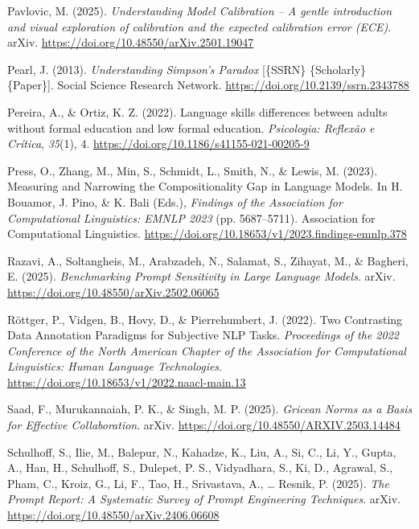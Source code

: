 \documentclass[
  12pt,
]{article}
\newlength{\cslhangindent}
\newenvironment{CSLReferences}[2] %
 {\begin{list}{}{%
  \setlength{\itemindent}{0pt}
  \setlength{\leftmargin}{0pt}
  \setlength{\parsep}{0pt}
  \ifodd #1
   \setlength{\leftmargin}{\cslhangindent}
   \setlength{\itemindent}{-1\cslhangindent}
  \fi
  \setlength{\itemsep}{#2\baselineskip}}}
 {\end{list}}
\begin{document}
\begin{CSLReferences}{1}{0}
Pavlovic, M. (2025). \emph{Understanding {Model} {Calibration} -- {A} gentle introduction and visual exploration of calibration and the expected calibration error ({ECE})}. arXiv. \url{https://doi.org/10.48550/arXiv.2501.19047}

Pearl, J. (2013). \emph{Understanding {Simpson}'s {Paradox}} {[}\{SSRN\} \{Scholarly\} \{Paper\}{]}. Social Science Research Network. \url{https://doi.org/10.2139/ssrn.2343788}

Pereira, A., \& Ortiz, K. Z. (2022). Language skills differences between adults without formal education and low formal education. \emph{Psicologia: Reflexão e Crítica}, \emph{35}(1), 4. \url{https://doi.org/10.1186/s41155-021-00205-9}

Press, O., Zhang, M., Min, S., Schmidt, L., Smith, N., \& Lewis, M. (2023). Measuring and {Narrowing} the {Compositionality} {Gap} in {Language} {Models}. In H. Bouamor, J. Pino, \& K. Bali (Eds.), \emph{Findings of the {Association} for {Computational} {Linguistics}: {EMNLP} 2023} (pp. 5687--5711). Association for Computational Linguistics. \url{https://doi.org/10.18653/v1/2023.findings-emnlp.378}

Razavi, A., Soltangheis, M., Arabzadeh, N., Salamat, S., Zihayat, M., \& Bagheri, E. (2025). \emph{Benchmarking {Prompt} {Sensitivity} in {Large} {Language} {Models}}. arXiv. \url{https://doi.org/10.48550/arXiv.2502.06065}

Röttger, P., Vidgen, B., Hovy, D., \& Pierrehumbert, J. (2022). Two {Contrasting} {Data} {Annotation} {Paradigms} for {Subjective} {NLP} {Tasks}. \emph{Proceedings of the 2022 {Conference} of the {North} {American} {Chapter} of the {Association} for {Computational} {Linguistics}: {Human} {Language} {Technologies}}. \url{https://doi.org/10.18653/v1/2022.naacl-main.13}

Saad, F., Murukannaiah, P. K., \& Singh, M. P. (2025). \emph{Gricean {Norms} as a {Basis} for {Effective} {Collaboration}}. arXiv. \url{https://doi.org/10.48550/ARXIV.2503.14484}

Schulhoff, S., Ilie, M., Balepur, N., Kahadze, K., Liu, A., Si, C., Li, Y., Gupta, A., Han, H., Schulhoff, S., Dulepet, P. S., Vidyadhara, S., Ki, D., Agrawal, S., Pham, C., Kroiz, G., Li, F., Tao, H., Srivastava, A., \ldots{} Resnik, P. (2025). \emph{The {Prompt} {Report}: {A} {Systematic} {Survey} of {Prompt} {Engineering} {Techniques}}. arXiv. \url{https://doi.org/10.48550/arXiv.2406.06608}


\end{CSLReferences}
\end{document}
